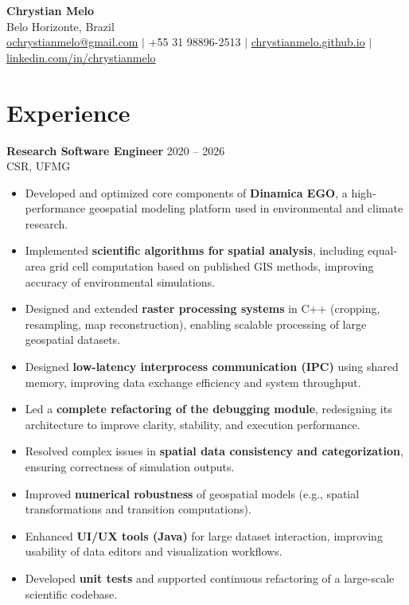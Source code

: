 \documentclass[10pt]{article}
\begin{document}
\begin{center}
    {\Large \noindent\textbf{Chrystian Melo}} \\
    Belo Horizonte, Brazil \\
    \href{mailto:ochrystianmelo@gmail.com}{ochrystianmelo@gmail.com} $\vert$
    +55 31 98896-2513 $\vert$ 
    \href{https://chrystianmelo.github.io}{chrystianmelo.github.io} $\vert$
    \href{https://www.linkedin.com/in/chrystianmelo/}{linkedin.com/in/chrystianmelo}
\end{center}

\vspace{-0.8em}

\section*{Experience}

\noindent\textbf{Research Software Engineer} \hfill 2020 -- 2026 \\
CSR, UFMG
\begin{itemize}
    \item Developed and optimized core components of \textbf{Dinamica EGO}, a high-performance geospatial modeling platform used in environmental and climate research.
    
    \item Implemented \textbf{scientific algorithms for spatial analysis}, including equal-area grid cell computation based on published GIS methods, improving accuracy of environmental simulations.
    
    \item Designed and extended \textbf{raster processing systems} in C++ (cropping, resampling, map reconstruction), enabling scalable processing of large geospatial datasets.
    
    \item Designed \textbf{low-latency interprocess communication (IPC)} using shared memory, improving data exchange efficiency and system throughput.
        
    \item Led a \textbf{complete refactoring of the debugging module}, redesigning its architecture to improve clarity, stability, and execution performance.
    
    \item Resolved complex issues in \textbf{spatial data consistency and categorization}, ensuring correctness of simulation outputs.
    
    \item Improved \textbf{numerical robustness} of geospatial models (e.g., spatial transformations and transition computations).
        
    \item Enhanced \textbf{UI/UX tools (Java)} for large dataset interaction, improving usability of data editors and visualization workflows.
    
    \item Developed \textbf{unit tests} and supported continuous refactoring of a large-scale scientific codebase.
\end{itemize}
\end{document}
